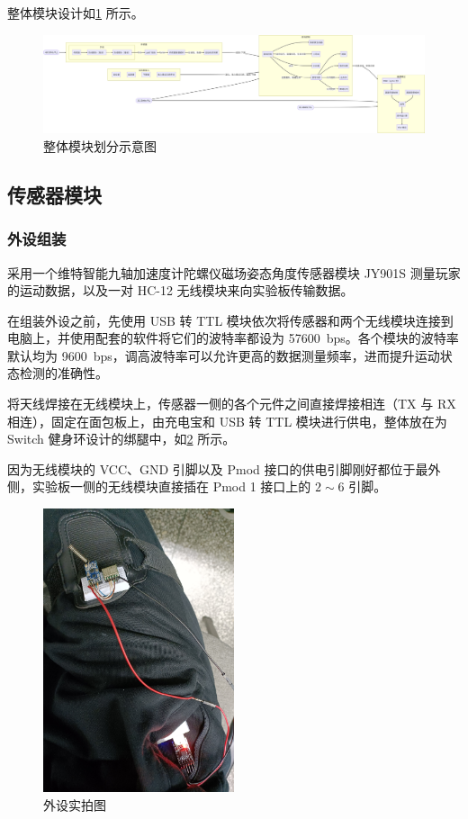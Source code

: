 \documentclass[UTF8, 11pt, fontset=none]{ctexart}
\begin{document}
整体模块设计如\cref{modules} 所示。

\begin{figure}[H]
    \centering
    \includegraphics[width=\textwidth]{images/modules.png}
    \caption{整体模块划分示意图}
    \label{modules}
\end{figure}

\subsection{传感器模块}

\subsubsection{外设组装}

采用一个维特智能九轴加速度计陀螺仪磁场姿态角度传感器模块 JY901S 测量玩家的运动数据，以及一对 HC-12 无线模块来向实验板传输数据。

在组装外设之前，先使用 USB 转 TTL 模块依次将传感器和两个无线模块连接到电脑上，并使用配套的软件将它们的波特率都设为 \SI{57600}{bps}。各个模块的波特率默认均为 \SI{9600}{bps}，调高波特率可以允许更高的数据测量频率，进而提升运动状态检测的准确性。

将天线焊接在无线模块上，传感器一侧的各个元件之间直接焊接相连（TX 与 RX 相连），固定在面包板上，由充电宝和 USB 转 TTL 模块进行供电，整体放在为 Switch 健身环设计的绑腿中，如\cref{sensor} 所示。

因为无线模块的 VCC、GND 引脚以及 Pmod 接口的供电引脚刚好都位于最外侧，实验板一侧的无线模块直接插在 Pmod 1 接口上的 $2 \sim 6$ 引脚。

\begin{figure}[ht]
    \centering
    \includegraphics[width=0.5\textwidth]{images/sensor.jpg}
    \caption{外设实拍图}
    \label{sensor}
\end{figure}
\end{document}
